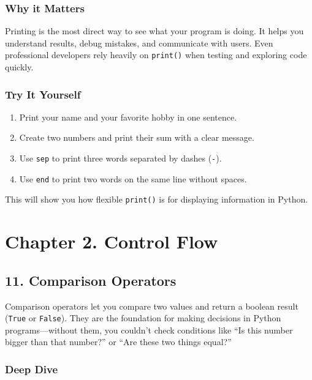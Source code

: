 \documentclass[
  letterpaper,
  DIV=11,
  numbers=noendperiod]{scrreprt}
\providecommand{\tightlist}{%
  \setlength{\itemsep}{0pt}\setlength{\parskip}{0pt}}
\begin{document}
\subsubsection{Why it Matters}\label{why-it-matters-10}

Printing is the most direct way to see what your program is doing. It
helps you understand results, debug mistakes, and communicate with
users. Even professional developers rely heavily on \texttt{print()}
when testing and exploring code quickly.

\subsubsection{Try It Yourself}\label{try-it-yourself-10}

\begin{enumerate}
\def\labelenumi{\arabic{enumi}.}
\tightlist
\item
  Print your name and your favorite hobby in one sentence.
\item
  Create two numbers and print their sum with a clear message.
\item
  Use \texttt{sep} to print three words separated by dashes
  (\texttt{-}).
\item
  Use \texttt{end} to print two words on the same line without spaces.
\end{enumerate}

This will show you how flexible \texttt{print()} is for displaying
information in Python.

\section{Chapter 2. Control Flow}\label{chapter-2.-control-flow}

\subsection{11. Comparison Operators}\label{comparison-operators}

Comparison operators let you compare two values and return a boolean
result (\texttt{True} or \texttt{False}). They are the foundation for
making decisions in Python programs---without them, you couldn't check
conditions like ``Is this number bigger than that number?'' or ``Are
these two things equal?''

\subsubsection{Deep Dive}\label{deep-dive-11}
\end{document}
